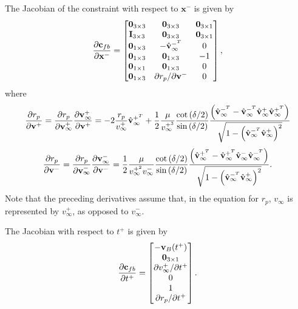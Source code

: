 The Jacobian of the constraint with respect to $\mathbf{x}^-$ is given by
\begin{equation}
\frac{\partial \mathbf{c}_{fb}}{\partial \mathbf{x}^-} = 
\begin{bmatrix}
   \mathbf{0}_{3 \times 3} & \mathbf{0}_{3 \times 3}  & \mathbf{0}_{3 \times 1} \\
   \mathbf{I}_{3 \times 3} & \mathbf{0}_{3 \times 3} & \mathbf{0}_{3 \times 1} \\
   \mathbf{0}_{1 \times 3} & -\hat{\mathbf{v}}_{\infty}^{-^T}    & 0\\
   \mathbf{0}_{1 \times 3} &  \mathbf{0}_{1 \times 3} & -1 \\
   \mathbf{0}_{1 \times 1} &  \mathbf{0}_{1 \times 3} & 0 \\
   \mathbf{0}_{1 \times 3} & \partial r_p/ \partial \mathbf{v}^-  & 0  \\
\end{bmatrix},
\end{equation}
%
where 
%
\begin{equation}
    \frac{\partial r_p}{\partial \mathbf{v}^+} = \frac{\partial r_p}{\partial \mathbf{v}_{\infty}^+}\frac{\partial \mathbf{v}_{\infty}^+}{\partial \mathbf{v}^+} =  
    -2 \frac{r_p}{v_{\infty}^+}\hat{\mathbf{v}}_{\infty}^{+^T} + \frac{1}{2}\frac{\mu}{v_{\infty}^{+^3}}             \frac{\cot{(\delta/2})}{\sin{(\delta/2)}}     
     \frac{ \left( \hat{\mathbf{v}}_{\infty}^{-^T} - \hat{\mathbf{v}}_{\infty}^{-^T} \hat{\mathbf{v}}_{\infty}^{+} \hat{\mathbf{v}}_{\infty}^{+^T} \right)}{\sqrt{1 - \left(\hat{\mathbf{v}}_{\infty}^{-^T} \hat{\mathbf{v}}_{\infty}^{+}\right)^2}} 
\end{equation}
%
\begin{equation}
    \frac{\partial r_p}{\partial \mathbf{v}^-} = \frac{\partial r_p}{\partial \mathbf{v}_{\infty}^-}\frac{\partial \mathbf{v}_{\infty}^-}{\partial \mathbf{v}^-} = \frac{1}{2}\frac{\mu}{v_{\infty}^{+^2} v_{\infty}^{-}} \frac{\cot{(\delta/2})}{\sin{(\delta/2)}}     
     \frac{ \left( \hat{\mathbf{v}}_{\infty}^{+^T} - \hat{\mathbf{v}}_{\infty}^{+^T} \hat{\mathbf{v}}_{\infty}^{-} \hat{\mathbf{v}}_{\infty}^{-^T} \right)}{\sqrt{1 - \left(\hat{\mathbf{v}}_{\infty}^{-^T} \hat{\mathbf{v}}_{\infty}^{+} \right)^2}}.
\end{equation}
%
Note that the preceding derivatives assume that, in the equation for $r_p$, $v_{\infty}$ is represented by $v_{\infty}^+$, as opposed to $v_{\infty}^-$. 

The Jacobian with respect to $t^+$ is given by
\begin{equation}
\frac{\partial \mathbf{c}_{fb}}{\partial t^+} = 
\begin{bmatrix}
   -\mathbf{v}_{B}(t^+)  \\
   \mathbf{0}_{3 \times 1}   \\
   \partial v_{\infty}^+ / \partial t^+ \\
   0  \\
   1 \\
   \partial r_p / \partial t^+ \\
\end{bmatrix}.
\end{equation}

